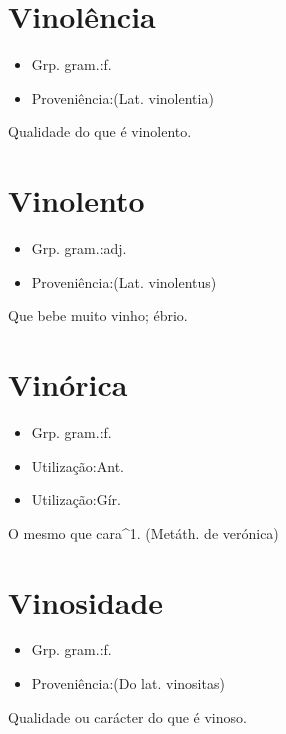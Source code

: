 \documentclass{article}
\begin{document}
\section{Vinolência}
\begin{itemize}
\item {Grp. gram.:f.}
\end{itemize}
\begin{itemize}
\item {Proveniência:(Lat. \textunderscore vinolentia\textunderscore )}
\end{itemize}
Qualidade do que é vinolento.
\section{Vinolento}
\begin{itemize}
\item {Grp. gram.:adj.}
\end{itemize}
\begin{itemize}
\item {Proveniência:(Lat. \textunderscore vinolentus\textunderscore )}
\end{itemize}
Que bebe muito vinho; ébrio.
\section{Vinórica}
\begin{itemize}
\item {Grp. gram.:f.}
\end{itemize}
\begin{itemize}
\item {Utilização:Ant.}
\end{itemize}
\begin{itemize}
\item {Utilização:Gír.}
\end{itemize}
O mesmo que \textunderscore cara\textunderscore ^1.
(Metáth. de \textunderscore verónica\textunderscore )
\section{Vinosidade}
\begin{itemize}
\item {Grp. gram.:f.}
\end{itemize}
\begin{itemize}
\item {Proveniência:(Do lat. \textunderscore vinositas\textunderscore )}
\end{itemize}
Qualidade ou carácter do que é vinoso.
\end{document}
